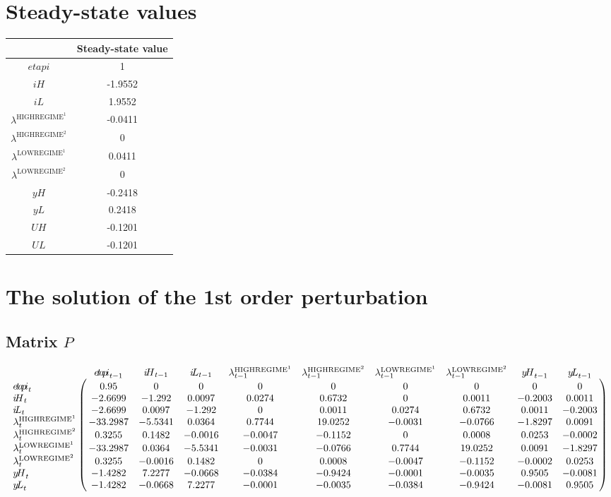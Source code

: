 

\section{Steady-state values}


\begin{tabular}{c|c|}
  & Steady-state value\\
\hline
${e\!t\!a\!p\!i}$ & 1 \\
${i\!H}$ & -1.9552 \\
${i\!L}$ & 1.9552 \\
$\lambda^{\mathrm{HIGHREGIME}^{\mathrm{1}}}$ & -0.0411 \\
$\lambda^{\mathrm{HIGHREGIME}^{\mathrm{2}}}$ & 0 \\
$\lambda^{\mathrm{LOWREGIME}^{\mathrm{1}}}$ & 0.0411 \\
$\lambda^{\mathrm{LOWREGIME}^{\mathrm{2}}}$ & 0 \\
${y\!H}$ & -0.2418 \\
${y\!L}$ & 0.2418 \\
${U\!H}$ & -0.1201 \\
${U\!L}$ & -0.1201 \\
\hline
\end{tabular}


\section{The solution of the 1st order perturbation}

\subsection*{Matrix $P$}

$$\bordermatrix{
~ & {e\!t\!a\!p\!i}_{t-1} & {i\!H}_{t-1} & {i\!L}_{t-1} & \lambda^{\mathrm{HIGHREGIME}^{\mathrm{1}}}_{t-1} & \lambda^{\mathrm{HIGHREGIME}^{\mathrm{2}}}_{t-1} & \lambda^{\mathrm{LOWREGIME}^{\mathrm{1}}}_{t-1} & \lambda^{\mathrm{LOWREGIME}^{\mathrm{2}}}_{t-1} & {y\!H}_{t-1} & {y\!L}_{t-1} \cr
{e\!t\!a\!p\!i}_{t} & 0.95 & 0 & 0 & 0 & 0 & 0 & 0 & 0 & 0 \cr
{i\!H}_{t} & -2.6699 & -1.292 & 0.0097 & 0.0274 & 0.6732 & 0 & 0.0011 & -0.2003 & 0.0011 \cr
{i\!L}_{t} & -2.6699 & 0.0097 & -1.292 & 0 & 0.0011 & 0.0274 & 0.6732 & 0.0011 & -0.2003 \cr
\lambda^{\mathrm{HIGHREGIME}^{\mathrm{1}}}_{t} & -33.2987 & -5.5341 & 0.0364 & 0.7744 & 19.0252 & -0.0031 & -0.0766 & -1.8297 & 0.0091 \cr
\lambda^{\mathrm{HIGHREGIME}^{\mathrm{2}}}_{t} & 0.3255 & 0.1482 & -0.0016 & -0.0047 & -0.1152 & 0 & 0.0008 & 0.0253 & -0.0002 \cr
\lambda^{\mathrm{LOWREGIME}^{\mathrm{1}}}_{t} & -33.2987 & 0.0364 & -5.5341 & -0.0031 & -0.0766 & 0.7744 & 19.0252 & 0.0091 & -1.8297 \cr
\lambda^{\mathrm{LOWREGIME}^{\mathrm{2}}}_{t} & 0.3255 & -0.0016 & 0.1482 & 0 & 0.0008 & -0.0047 & -0.1152 & -0.0002 & 0.0253 \cr
{y\!H}_{t} & -1.4282 & 7.2277 & -0.0668 & -0.0384 & -0.9424 & -0.0001 & -0.0035 & 0.9505 & -0.0081 \cr
{y\!L}_{t} & -1.4282 & -0.0668 & 7.2277 & -0.0001 & -0.0035 & -0.0384 & -0.9424 & -0.0081 & 0.9505 \cr
}$$

